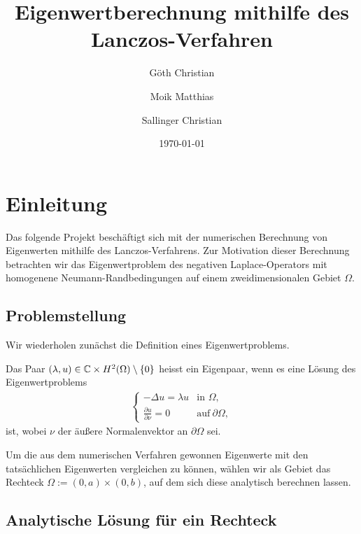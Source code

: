 \documentclass{article}
\begin{document}
\title
{
	Eigenwertberechnung mithilfe des Lanczos-Verfahren
}
\author
{
	Göth Christian
	\and
	Moik Matthias
	\and
	Sallinger Christian
}
\date{\today}
\maketitle

\newpage
\tableofcontents
\newpage


\section{Einleitung}

Das folgende Projekt beschäftigt sich mit der numerischen Berechnung von Eigenwerten mithilfe des Lanczos-Verfahrens. Zur Motivation dieser Berechnung betrachten wir das Eigenwertproblem des negativen Laplace-Operators mit homogenene Neumann-Randbedingungen auf einem zweidimensionalen Gebiet $\Omega$.

\subsection{Problemstellung}

Wir wiederholen zunächst die Definition eines Eigenwertproblems.

\begin{definition}
	Das Paar $(\lambda, u) \in \mathbb{C} \times H^2(\Omega) \setminus \{0\}$ heisst ein Eigenpaar, wenn es eine Lösung des Eigenwertproblems
	\begin{align}
	    \begin{cases}
	    -\Delta u = \lambda u & \text{in } \Omega, \\
	    \frac{\partial u}{\partial \nu} = 0 & \text{auf}~ \partial\Omega,
	    \end{cases}
	    \label{neumann}
	\end{align}
	ist, wobei $\nu$ der äußere Normalenvektor an $\partial\Omega$ sei.
\end{definition}

Um die aus dem numerischen Verfahren gewonnen Eigenwerte mit den tatsächlichen Eigenwerten vergleichen zu können, wählen wir als Gebiet das Rechteck $\Omega := (0,a) \times (0,b)$, auf dem sich diese analytisch berechnen lassen.

\subsection{Analytische Lösung für ein Rechteck}
\end{document}
